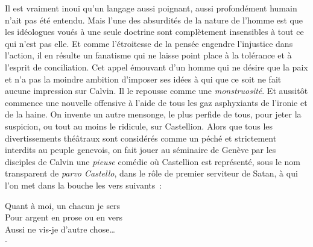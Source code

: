 \documentclass[french,twoside]{book} %
\newcommand\foreign[1]{\emph{#1}}
\begin{document}
\noindent Il est vraiment inouï qu’un langage aussi poignant, aussi profondément humain n’ait pas été entendu. Mais l’une des absurdités de la nature de l’homme est que les idéologues voués à une seule doctrine sont complètement insensibles à tout ce qui n’est pas elle. Et comme l’étroitesse de la pensée engendre l’injustice dans l’action, il en résulte un fanatisme qui ne laisse point place à la tolérance et à l’esprit de conciliation. Cet appel émouvant d’un homme qui ne désire que la paix et n’a pas la moindre ambition d’imposer ses idées à qui que ce soit ne fait aucune impression sur Calvin. Il le repousse comme une \emph{monstruosité}. Et aussitôt commence une nouvelle offensive à l’aide de tous les gaz asphyxiants de l’ironie et de la haine. On invente un autre mensonge, le plus perfide de tous, pour jeter la suspicion, ou tout au moins le ridicule, sur Castellion. Alors que tous les divertissements théâtraux sont considérés comme un péché et strictement interdits au peuple genevois, on fait jouer au séminaire de Genève par les disciples de Calvin une \emph{pieuse} comédie où Castellion est représenté, sous le nom transparent de \foreign{parvo Castello}, dans le rôle de premier serviteur de Satan, à qui l’on met dans la bouche les vers suivants :\par

\begin{poem}
Quant à moi, un chacun je sers \\
Pour argent en prose ou en vers \\
Aussi ne vis-je d’autre chose… \\-
\end{poem}
\end{document}
